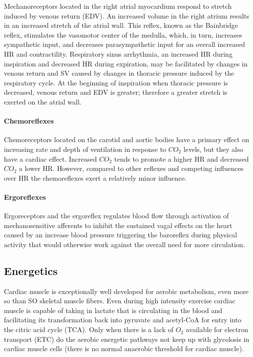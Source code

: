 Mechanoreceptors located in the right atrial myocardium respond to stretch induced by venous return (EDV). An increased volume in the right atrium results in an increased stretch of the atrial wall. This reflex, known as the Bainbridge reflex, stimulates the vasomotor center of the medulla, which, in turn, increases sympathetic input, and decreases parasympathetic input for an overall increased HR and contractility. Respiratory sinus arrhythmia, an increased HR during inspiration and decreased HR during expiration, may be facilitated by changes in venous return and SV caused by changes in thoracic pressure induced by the respiratory cycle. At the beginning of inspiration when thoracic pressure is decreased, venous return and EDV is greater; therefore a greater stretch is exerted on the atrial wall.

\paragraph{Chemoreflexes}
Chemoreceptors located on the carotid and aortic bodies have a primary effect on increasing rate and depth of ventilation in response to $CO_2$ levels, but they also have a cardiac effect. Increased $CO_2$ tends to promote a higher HR and decreased $CO_2$ a lower HR. However, compared to other reflexes and competing influences over HR the chemoreflexes exert a relatively minor influence.

\paragraph{Ergoreflexes}
Ergoreceptors and the ergoreflex regulates blood flow through activation of mechanosensitive afferents to inhibit the sustained vagal effects on the heart caused by an increase blood pressure triggering the baroreflex during physical activity that would otherwise work against the overall need for more circulation.

\subsection{Energetics}

Cardiac muscle is exceptionally well developed for aerobic metabolism, even more so than SO skeletal muscle fibers. Even during high intensity exercise cardiac muscle is capable of taking in lactate that is circulating in the blood and facilitating its transformation back into pyruvate and acetyl-CoA for entry into the citric acid cycle (TCA). Only when there is a lack of $O_2$ available for electron transport (ETC) do the aerobic energetic pathways not keep up with glycolosis in cardiac muscle cells (there is no normal anaerobic threshold for cardiac muscle). 

